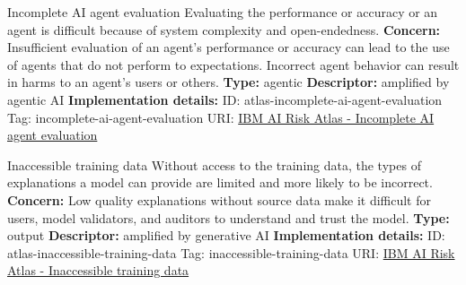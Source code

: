 \documentclass[a4paper,12pt]{article}
\begin{document}
\begin{definitionbox}{Incomplete AI agent evaluation}
Evaluating the performance or accuracy or an agent is difficult because of system complexity and open-endedness.\newline\newline
\textbf{Concern: }Insufficient evaluation of an agent's performance or accuracy can lead to the use of agents that do not perform to expectations. Incorrect agent behavior can result in harms to an agent's users or others.\newline\newline
\textbf{Type: }agentic\newline
\textbf{Descriptor: }amplified by agentic AI \newline\newline
\textbf{Implementation details: } \newline
ID: atlas-incomplete-ai-agent-evaluation \newline
Tag: incomplete-ai-agent-evaluation \newline
URI:  \href{https://www.ibm.com/docs/en/watsonx/saas?topic=SSYOK8/wsj/ai-risk-atlas/incomplete-ai-agent-evaluation.html}{IBM AI Risk Atlas - Incomplete AI agent evaluation}\newline
\end{definitionbox}
\begin{definitionbox}{Inaccessible training data}
Without access to the training data, the types of explanations a model can provide are limited and more likely to be incorrect.\newline\newline
\textbf{Concern: }Low quality explanations without source data make it difficult for users, model validators, and auditors to understand and trust the model.\newline\newline
\textbf{Type: }output\newline
\textbf{Descriptor: }amplified by generative AI \newline\newline
\textbf{Implementation details: } \newline
ID: atlas-inaccessible-training-data \newline
Tag: inaccessible-training-data \newline
URI:  \href{https://www.ibm.com/docs/en/watsonx/saas?topic=SSYOK8/wsj/ai-risk-atlas/inaccessible-training-data.html}{IBM AI Risk Atlas - Inaccessible training data}\newline
\end{definitionbox}
\end{document}
